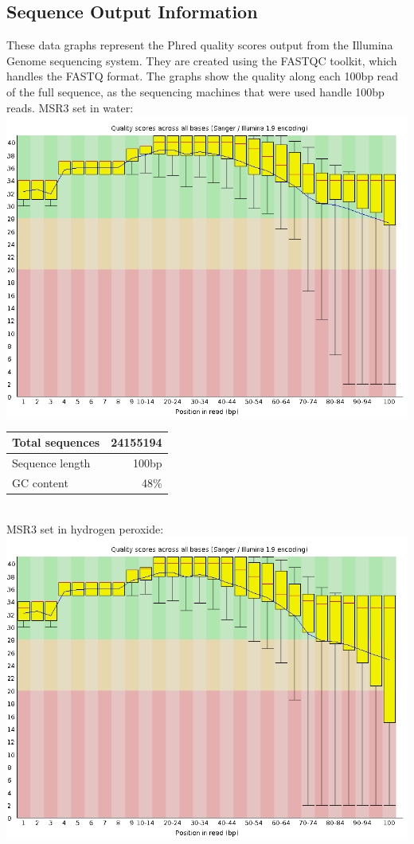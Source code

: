 \documentclass{article}
\begin{document}
\subsection{Sequence Output Information}
	These data graphs represent the Phred quality scores output from the Illumina Genome sequencing system. They are created using the FASTQC toolkit, which handles the FASTQ format. The graphs show the quality along each 100bp read of the full sequence, as the sequencing machines that were used handle 100bp reads.
\newpage
MSR3 set in water: \\
\includegraphics[scale=0.3]{msr3_h20_r1_basequal.png} \\
	\begin{tabular}{| l | r |}
	\hline
	Total sequences & 24155194 \\ \hline
	Sequence length & 100bp \\ \hline
	GC content & 48\% \\ \hline
	\end{tabular} \linebreak
\\
MSR3 set in hydrogen peroxide: \\
\includegraphics[scale=0.3]{msr3_h202_r1_basequal.png} \\
\end{document}
